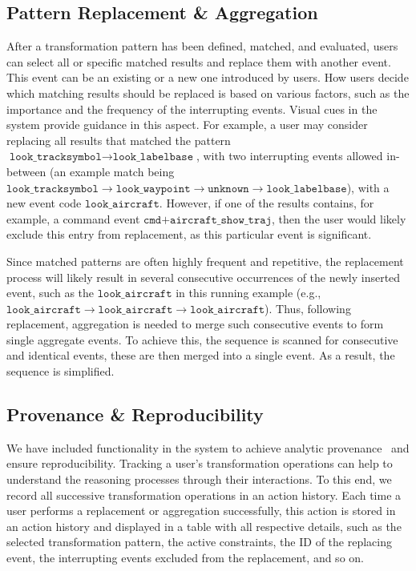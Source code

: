 \documentclass[camera]{vgtc}                          %
\begin{document}
\subsection{Pattern Replacement \& Aggregation}
\label{sec:aggregate}
After a transformation pattern has been defined, matched, and evaluated, users can select all or specific matched results and replace them with another event. This event can be an existing or a new one introduced by users. 
How users decide which matching results should be replaced is based on various factors, such as the importance and the frequency of the interrupting events. Visual cues in the system provide guidance in this aspect. For example, a user may consider replacing all results that matched the pattern $ \texttt{look\_tracksymbol} \rightarrow \texttt{look\_labelbase} $, with two interrupting events allowed in-between (an example match being $ \texttt{look\_tracksymbol} \rightarrow \texttt{look\_waypoint} \rightarrow \texttt{unknown} \rightarrow \texttt{look\_labelbase} $), with a new event code $ \texttt{look\_aircraft} $. However, if one of the results contains, for example, a command event $ \texttt{cmd+aircraft\_show\_traj} $, then the user would likely exclude this entry from replacement, as this particular event is significant. 

Since matched patterns are often highly frequent and repetitive, the replacement process will likely result in several consecutive occurrences of the newly inserted event, such as the $ \texttt{look\_aircraft} $ in this running example (e.g., $ \texttt{look\_aircraft} \rightarrow \texttt{look\_aircraft} \rightarrow \texttt{look\_aircraft} $). Thus, following replacement, aggregation is needed to merge such consecutive events to form single aggregate events. 
To achieve this, the sequence is scanned for consecutive and identical events, these are then merged into a single event. As a result, the sequence is simplified.

\subsection{Provenance \& Reproducibility}
We have included functionality in the system to achieve analytic provenance~\cite{North2011Analytic, Xu2020Survey} and ensure reproducibility. 
Tracking a user's transformation operations can help to understand the reasoning processes through their interactions.
To this end, we record all successive transformation operations in an action history. 
Each time a user performs a replacement or aggregation successfully, this action is stored in an action history and displayed in a table with all respective details, such as the selected transformation pattern, the active constraints, the ID of the replacing event, the interrupting events excluded from the replacement, and so on. 
\end{document}
